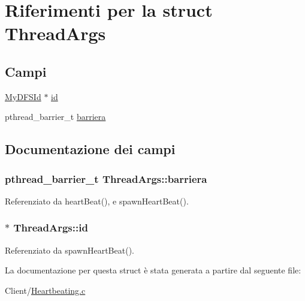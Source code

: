 \hypertarget{structThreadArgs}{\section{Riferimenti per la struct Thread\+Args}
\label{structThreadArgs}
}
\subsection*{Campi}
\begin{DoxyCompactItemize}
\item 
\hyperlink{structMyDFSId}{My\+D\+F\+S\+Id} $\ast$ \hyperlink{structThreadArgs_ab54572644fa37e1d2fa284d4217fc372}{id}
\item 
pthread\+\_\+barrier\+\_\+t \hyperlink{structThreadArgs_a7ca0bdd546803a7e595b376aac79347c}{barriera}
\end{DoxyCompactItemize}


\subsection{Documentazione dei campi}
\hypertarget{structThreadArgs_a7ca0bdd546803a7e595b376aac79347c}{
\subsubsection[{barriera}]{\setlength{\rightskip}{0pt plus 5cm}pthread\+\_\+barrier\+\_\+t Thread\+Args\+::barriera}}\label{structThreadArgs_a7ca0bdd546803a7e595b376aac79347c}


Referenziato da heart\+Beat(), e spawn\+Heart\+Beat().

\hypertarget{structThreadArgs_ab54572644fa37e1d2fa284d4217fc372}{
\subsubsection[{id}]{$\ast$ Thread\+Args\+::id}}\label{structThreadArgs_ab54572644fa37e1d2fa284d4217fc372}


Referenziato da spawn\+Heart\+Beat().



La documentazione per questa struct è stata generata a partire dal seguente file\+:\begin{DoxyCompactItemize}
\item 
Client/\hyperlink{Client_2Heartbeating_8c}{Heartbeating.\+c}\end{DoxyCompactItemize}
